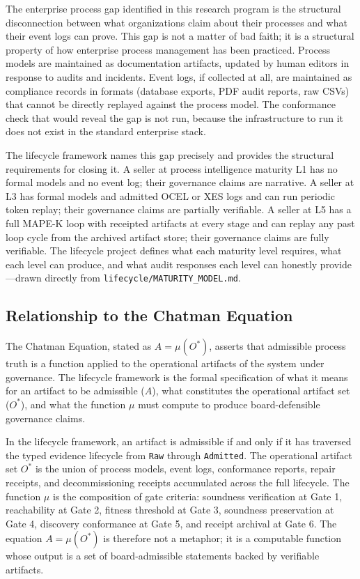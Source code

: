 The enterprise process gap identified in this research program is the structural
disconnection between what organizations claim about their processes and what their
event logs can prove. This gap is not a matter of bad faith; it is a structural property
of how enterprise process management has been practiced. Process models are maintained
as documentation artifacts, updated by human editors in response to audits and incidents.
Event logs, if collected at all, are maintained as compliance records in formats
(database exports, PDF audit reports, raw CSVs) that cannot be directly replayed against
the process model. The conformance check that would reveal the gap is not run, because
the infrastructure to run it does not exist in the standard enterprise stack.

The lifecycle framework names this gap precisely and provides the structural requirements
for closing it. A seller at process intelligence maturity L1 has no formal models and
no event log; their governance claims are narrative. A seller at L3 has formal models
and admitted OCEL or XES logs and can run periodic token replay; their governance
claims are partially verifiable. A seller at L5 has a full MAPE-K loop with receipted
artifacts at every stage and can replay any past loop cycle from the archived artifact
store; their governance claims are fully verifiable. The lifecycle project defines what
each maturity level requires, what each level can produce, and what audit responses
each level can honestly provide---drawn directly from \texttt{lifecycle/MATURITY\_MODEL.md}.

\subsection{Relationship to the Chatman Equation}
\label{sec:lifecycle-lineage-chatman}

The Chatman Equation, stated as $A = \mu(O^*)$, asserts that admissible process truth
is a function applied to the operational artifacts of the system under governance. The
lifecycle framework is the formal specification of what it means for an artifact to be
admissible ($A$), what constitutes the operational artifact set ($O^*$), and what the
function $\mu$ must compute to produce board-defensible governance claims.

In the lifecycle framework, an artifact is admissible if and only if it has traversed the
typed evidence lifecycle from \texttt{Raw} through \texttt{Admitted}. The operational
artifact set $O^*$ is the union of process models, event logs, conformance reports, repair
receipts, and decommissioning receipts accumulated across the full lifecycle. The function
$\mu$ is the composition of gate criteria: soundness verification at Gate 1, reachability
at Gate 2, fitness threshold at Gate 3, soundness preservation at Gate 4, discovery
conformance at Gate 5, and receipt archival at Gate 6. The equation $A = \mu(O^*)$ is
therefore not a metaphor; it is a computable function whose output is a set of
board-admissible statements backed by verifiable artifacts.

